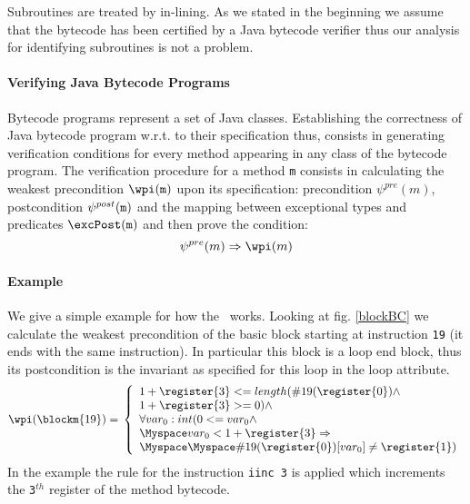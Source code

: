 

Subroutines are treated by in-lining. As we stated in the beginning we assume that the bytecode has been certified by a Java
bytecode verifier thus our analysis for identifying  subroutines is not a problem.  


\paragraph{Verifying Java Bytecode Programs} Bytecode programs represent a set of Java classes. Establishing the correctness of Java bytecode program w.r.t. to their specification thus, consists in generating verification conditions for every method appearing in any class of the bytecode program.
The verification procedure for a method \texttt{m} consists in  calculating the weakest precondition $\wpi(\tt{m})$ upon its specification: precondition $\psi^{pre}(m)$, 
postcondition $\psi^{post}(\tt{m})$ and the mapping between exceptional types and predicates $\excPost(\tt{m})$ and then prove the condition: 
$$
\psi^{pre}(m)  \Rightarrow \wpi(m)
$$    

\paragraph{Example} We give a simple example for how the \wpi \ works. Looking at fig. \ref{blockBC} we calculate the weakest precondition of the basic block starting at instruction \texttt{19} (it ends with the same instruction). In particular this block is a loop end block, thus its postcondition is
the invariant as specified for this loop in the loop attribute.
$$
\wpi(\blockm{19}) = \\
\left\{ \begin{array}{l}    
1 + \register{3} <= length(\#19(\register{0}) \wedge \\
                      1 + \register{3} >= 0)  \wedge \\ 
                        \forall  var_0:int  (  0 <= var_0 \wedge \\
                    \Myspace    var_0 < 1 + \register{3}  \Rightarrow \\
                \Myspace \Myspace \#19(\register{0})[var_0] \neq \register{1})
\end{array}
\right.
$$
In the example the rule for the instruction \texttt{iinc 3} is applied which increments the \texttt{3$^{th}$} register of the method bytecode. 

